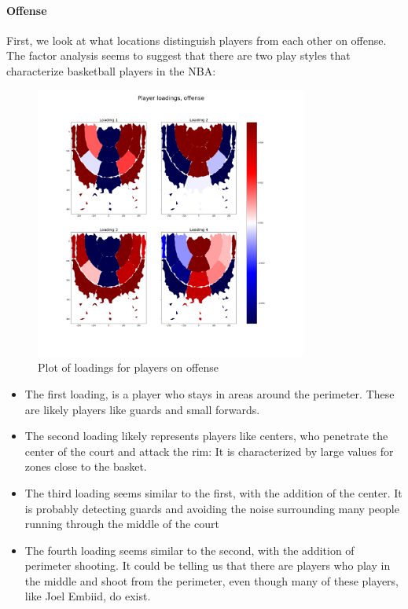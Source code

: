 \documentclass[]{article}
\let\oldparagraph\paragraph
\renewcommand{\paragraph}[1]{\oldparagraph{#1}\mbox{}}
\begin{document}
\paragraph{Offense}\label{offense}

First, we look at what locations distinguish players from each other on
offense. The factor analysis seems to suggest that there are two play
styles that characterize basketball players in the NBA:

\begin{figure}
\centering
\includegraphics[width=0.80000\textwidth]{first_4_loadings_players_off.png}
\caption{Plot of loadings for players on offense}
\end{figure}

\begin{itemize}
\item
  The first loading, is a player who stays in areas around the
  perimeter. These are likely players like guards and small forwards.
\item
  The second loading likely represents players like centers, who
  penetrate the center of the court and attack the rim: It is
  characterized by large values for zones close to the basket.
\item
  The third loading seems similar to the first, with the addition of the
  center. It is probably detecting guards and avoiding the noise
  surrounding many people running through the middle of the court
\item
  The fourth loading seems similar to the second, with the addition of
  perimeter shooting. It could be telling us that there are players who
  play in the middle and shoot from the perimeter, even though many of
  these players, like Joel Embiid, do exist.
\end{itemize}
\end{document}
